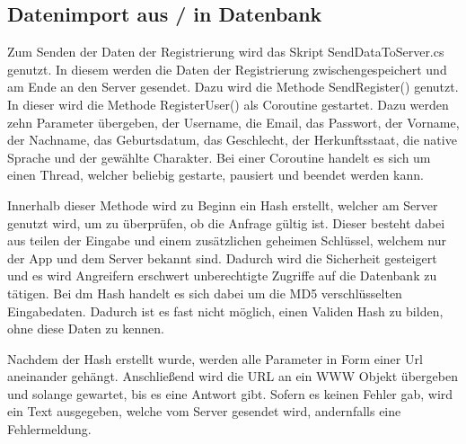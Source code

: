 \subsection{Datenimport aus / in Datenbank}

Zum Senden der Daten der Registrierung wird das Skript SendDataToServer.cs genutzt. In diesem werden die Daten der Registrierung zwischengespeichert und am Ende an den Server gesendet. Dazu wird die Methode SendRegister() genutzt. In dieser wird die Methode RegisterUser() als Coroutine gestartet. Dazu werden zehn Parameter übergeben, der Username, die Email, das Passwort, der Vorname, der Nachname, das Geburtsdatum, das Geschlecht, der Herkunftsstaat, die native Sprache und der gewählte Charakter. Bei einer Coroutine handelt es sich um einen Thread, welcher beliebig gestarte, pausiert und beendet werden kann.

Innerhalb dieser Methode wird zu Beginn ein Hash erstellt, welcher am Server genutzt wird, um zu überprüfen, ob die Anfrage gültig ist. Dieser besteht dabei aus teilen der Eingabe und einem zusätzlichen geheimen Schlüssel, welchem nur der App und dem Server bekannt sind. Dadurch wird die Sicherheit gesteigert und es wird Angreifern erschwert unberechtigte Zugriffe auf die Datenbank zu tätigen. Bei dm Hash handelt es sich dabei um die MD5 verschlüsselten Eingabedaten. Dadurch ist es fast nicht möglich, einen Validen Hash zu bilden, ohne diese Daten zu kennen.

Nachdem der Hash erstellt wurde, werden alle Parameter in Form einer Url aneinander gehängt. Anschließend wird die URL an ein WWW Objekt übergeben und solange gewartet, bis es eine Antwort gibt. Sofern es keinen Fehler gab, wird ein Text ausgegeben, welche vom Server gesendet wird, andernfalls eine Fehlermeldung.


